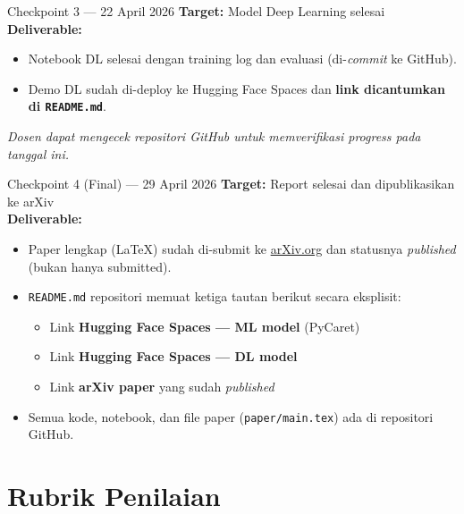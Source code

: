 \documentclass[11pt,a4paper]{article}
\begin{document}
\vspace{0.5em}

\begin{checkpointbox}[colframe=itera!40!orange]{Checkpoint 3 --- 22 April 2026}
\textbf{Target:} Model Deep Learning selesai\\[4pt]
\textbf{Deliverable:}
\begin{itemize}[noitemsep]
  \item Notebook DL selesai dengan training log dan evaluasi (di-\textit{commit} ke GitHub).
  \item Demo DL sudah di-deploy ke Hugging Face Spaces dan \textbf{link dicantumkan di \texttt{README.md}}.
\end{itemize}
\textit{\small Dosen dapat mengecek repositori GitHub untuk memverifikasi progress pada tanggal ini.}
\end{checkpointbox}

\vspace{0.5em}

\begin{checkpointbox}[colframe=accent]{Checkpoint 4 (Final) --- 29 April 2026}
\textbf{Target:} Report selesai dan dipublikasikan ke arXiv\\[4pt]
\textbf{Deliverable:}
\begin{itemize}[noitemsep]
  \item Paper lengkap (LaTeX) sudah di-submit ke \href{https://arxiv.org}{arXiv.org} dan statusnya \textit{published} (bukan hanya submitted).
  \item \texttt{README.md} repositori memuat ketiga tautan berikut secara eksplisit:
  \begin{itemize}[noitemsep]
    \item Link \textbf{Hugging Face Spaces --- ML model} (PyCaret)
    \item Link \textbf{Hugging Face Spaces --- DL model}
    \item Link \textbf{arXiv paper} yang sudah \textit{published}
  \end{itemize}
  \item Semua kode, notebook, dan file paper (\texttt{paper/main.tex}) ada di repositori GitHub.
\end{itemize}
\end{checkpointbox}


\section{Rubrik Penilaian}
\end{document}
